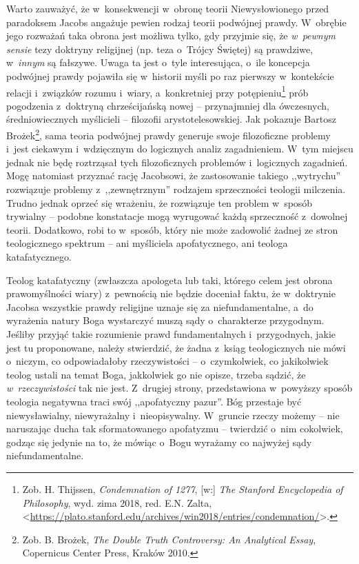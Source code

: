 Warto zauważyć, że w~konsekwencji w~obronę teorii Niewysłowionego przed paradoksem Jacobs angażuje pewien rodzaj teorii podwójnej prawdy. W~obrębie jego rozważań taka obrona jest możliwa tylko, gdy przyjmie się, że \textit{w~pewnym sensie} tezy doktryny religijnej (np. teza o~Trójcy Świętej) są prawdziwe, w~\textit{innym} są fałszywe. Uwaga ta jest o~tyle interesująca, o~ile koncepcja podwójnej prawdy pojawiła się w~historii myśli po raz pierwszy w~kontekście relacji i~związków rozumu i~wiary, a~konkretniej przy potępieniu\footnote{Zob. H. Thijssen, \textit{Condemnation of 1277}, [w:] \textit{The Stanford Encyclopedia of Philosophy}, wyd. zima 2018, red. E.N. Zalta, {\textless}\url{https://plato.stanford.edu/archives/win2018/entries/condemnation/}{\textgreater}.} prób pogodzenia z~doktryną chrześcijańską nowej -- przynajmniej dla ówczesnych, średniowiecznych myślicieli -- filozofii arystotelesowskiej. Jak pokazuje Bartosz Brożek\footnote{Zob. B. Brożek, \textit{The Double Truth Controversy: An Analytical Essay}, Copernicus Center Press, Kraków 2010.}, sama teoria podwójnej prawdy generuje swoje filozoficzne problemy i~jest ciekawym i~wdzięcznym do logicznych analiz zagadnieniem. W~tym miejscu jednak nie będę roztrząsał tych filozoficznych problemów i~logicznych zagadnień. Mogę natomiast przyznać rację Jacobsowi, że zastosowanie takiego ,,wytrychu'' rozwiązuje problemy z~,,zewnętrznym'' rodzajem sprzeczności teologii milczenia. Trudno jednak oprzeć się wrażeniu, że rozwiązuje ten problem w~sposób trywialny -- podobne konstatacje mogą wyrugować każdą sprzeczność z~dowolnej teorii. Dodatkowo, robi to w~sposób, który nie może zadowolić żadnej ze stron teologicznego spektrum -- ani myśliciela apofatycznego, ani teologa katafatycznego.

Teolog katafatyczny (zwłaszcza apologeta lub taki, którego celem jest obrona prawomyślności wiary) z~pewnością nie będzie doceniał faktu, że w~doktrynie Jacobsa wszystkie prawdy religijne uznaje się za niefundamentalne, a~do wyrażenia natury Boga wystarczyć muszą sądy o~charakterze przygodnym. Jeśliby przyjąć takie rozumienie prawd fundamentalnych i~przygodnych, jakie jest tu proponowane, należy stwierdzić, że żadna z~ksiąg teologicznych nie mówi o~niczym, co odpowiadałoby rzeczywistości -- o~czymkolwiek, co jakikolwiek teolog ustali na temat Boga, jakkolwiek go nie opisze, trzeba sądzić, że \textit{w~rzeczywistości} tak nie jest. Z~drugiej strony, przedstawiona w~powyższy sposób teologia negatywna traci swój ,,apofatyczny pazur''. Bóg przestaje być niewysławialny, niewyrażalny i~nieopisywalny. W~gruncie rzeczy możemy -- nie naruszając ducha tak sformatowanego apofatyzmu -- twierdzić o~nim cokolwiek, godząc się jedynie na to, że mówiąc o~Bogu wyrażamy co najwyżej sądy niefundamentalne.

